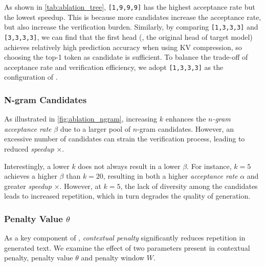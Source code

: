 As shown in \cref{tab:ablation_tree}, \texttt{[1,9,9,9]} has the highest acceptance rate but the lowest speedup. This is because more candidates increase the acceptance rate, but also increase the verification burden. Similarly, by comparing \texttt{[1,3,3,3]} and \texttt{[3,3,3,3]}, we can find that the first head (\ie, the original head of target model) achieves relatively high prediction accuracy when using KV compression, so choosing the top-1 token as candidate is sufficient. To balance the trade-off of acceptance rate and verification efficiency, we adopt \texttt{[1,3,3,3]} as the configuration of \ours.

\subsubsection{N-gram Candidates}
As illustrated in \cref{fig:ablation_ngram}, increasing $k$ enhances the \emph{$n$-gram acceptance rate} $\beta$ due to a larger pool of $n$-gram candidates. However, an excessive number of candidates can strain the verification process, leading to reduced \emph{speedup} $\times$.


Interestingly, a lower $k$ does not always result in a lower $\beta$. For instance, $k=5$ achieves a higher $\beta$ than $k=20$, resulting in both a higher \emph{acceptance rate} $\alpha$ and greater \emph{speedup} $\times$. However, at $k=5$, the lack of diversity among the candidates leads to increased repetition, which in turn degrades the quality of generation.

\subsubsection{Penalty Value $\theta$}
As a key component of \ours, \textit{contextual penalty} significantly reduces repetition in generated text. We examine the effect of two parameters present in contextual penalty, \ie penalty value $\theta$ and penalty window $W$. 



